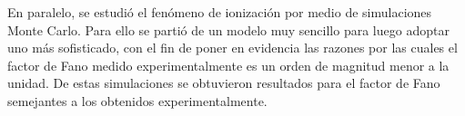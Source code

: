 
En paralelo, se estudió el fenómeno de ionización por medio de simulaciones Monte Carlo. Para ello se partió de un modelo muy sencillo para luego adoptar uno más sofisticado, con el fin de poner en evidencia las razones por las cuales el factor de Fano medido experimentalmente es un orden de magnitud menor a la unidad. De estas simulaciones se obtuvieron resultados para el factor de Fano semejantes a los obtenidos experimentalmente.






